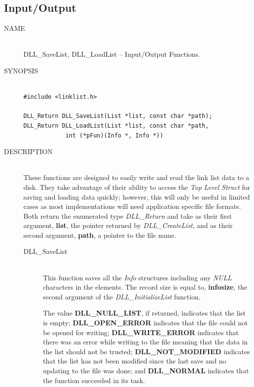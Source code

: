 \documentclass[10pt,letterpaper,titlepage]{article}
\begin{document}
\newpage

\subsection{Input/Output}
\begin{description}
\item[NAME]\quad\\
DLL\_SaveList, DLL\_LoadList -- Input/Output Functions.

\item[SYNOPSIS]
\begin{verbatim}

#include <linklist.h>

DLL_Return DLL_SaveList(List *list, const char *path);
DLL_Return DLL_LoadList(List *list, const char *path,
            int (*pFun)(Info *, Info *))
\end{verbatim}

\item[DESCRIPTION]\quad\\
These functions are designed to easily write and read the link list data to a disk.  They take advantage of their ability to access the \emph{Top Level Struct} for saving and loading data quickly; however, this will only be useful in limited cases as most implementations will need application specific file formats.  Both return the enumerated type \emph{DLL\_Return} and take as their first argument, \textbf{list}, the pointer returned by \emph{DLL\_CreateList}, and as their second argument, \textbf{path}, a pointer to the file name.

 \begin{description}
 \item[DLL\_SaveList]\quad\\
 This function saves all the \emph{Info} structures including any \emph{NULL} characters in the elements.  The record size is equal to, \textbf{infosize}, the second argument of the \emph{DLL\_InitializeList} function.
\vspace{8pt}

\noindent
  The value \textbf{DLL\_NULL\_LIST}, if returned, indicates that the list is empty; \textbf{DLL\_OPEN\_ERROR} indicates that the file could not be opened for writing; \textbf{DLL\_WRITE\_ERROR} indicates that there was an error while writing to the file meaning that the data in the list should not be trusted; \textbf{DLL\_NOT\_MODIFIED} indicates that the list has not been modified since the last save and no updating to the file was done; and \textbf{DLL\_NORMAL} indicates that the function succeeded in its task.


\end{description}
\end{description}
\end{document}
